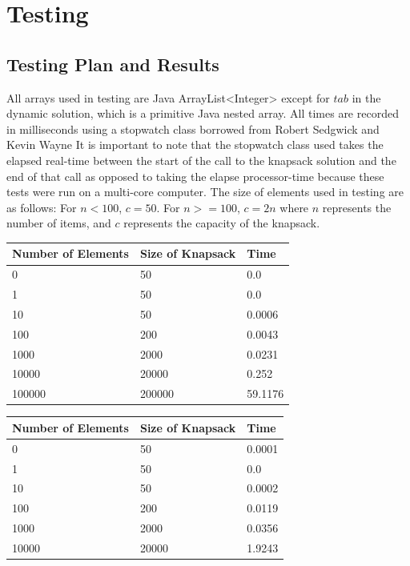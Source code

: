 \documentclass[onecolumn, 12pt, article]{IEEEtran}
\numberwithin{case}{problem}
\numberwithin{condition}{problem}
\numberwithin{condition}{subsection}
\numberwithin{definition}{section}
\theoremstyle{remark}
\numberwithin{question}{problem}
\theoremstyle{plain}
\numberwithin{answer}{problem}
\numberwithin{solution}{section}
\numberwithin{equation}{section}%
\begin{document}

\section{Testing}
\subsection{Testing Plan and Results}
All arrays used in testing are Java ArrayList<Integer> except for $tab$ in the dynamic solution, which is a primitive Java nested array. All times are recorded in milliseconds using a stopwatch class borrowed from Robert Sedgwick and Kevin Wayne \cite{stopwatch}
It is important to note that the stopwatch class used takes the elapsed real-time between the start of the call to the knapsack solution and the end of that call as opposed to taking the elapse processor-time because these tests were run on a multi-core computer.
The size of elements used in testing are as follows: For $n < 100$, $c = 50$. For $n >= 100$, $c = 2n$ where $n$ represents the number of items, and $c$ represents the capacity of the knapsack.
\newline
{}
\begin{center}
\begin{tabular}{|l|l|l|}
\hline Number of Elements & Size of Knapsack & Time \\
\hline 0 & 50 & 0.0 \\
\hline 1 & 50 & 0.0 \\
\hline 10 & 50 & 0.0006 \\
\hline 100 & 200 & 0.0043 \\
\hline 1000 & 2000 & 0.0231 \\
\hline 10000 & 20000 & 0.252 \\
\hline 100000 & 200000 & 59.1176 \\
\hline
\end{tabular}
\end{center}
\begin{center}
\begin{tabular}{|l|l|l|}
\hline Number of Elements & Size of Knapsack & Time \\
\hline 0 & 50 & 0.0001 \\
\hline 1 & 50 & 0.0 \\
\hline 10 & 50 & 0.0002 \\
\hline 100 & 200 & 0.0119 \\
\hline 1000 & 2000 & 0.0356 \\
\hline 10000 & 20000 & 1.9243 \\
\hline
\end{tabular}
\end{center}
\end{document}
